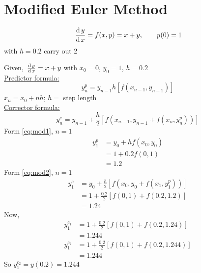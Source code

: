 \documentclass[../main-sheet.tex]{subfiles}
\begin{document}
\section{Modified Euler Method}
\begin{ex}
    \[\,\frac{\mathrm{d}\,y}{\mathrm{d}\,x}=f(x,y)=x+y,\qquad y(0)=1\]
    with \(h=0.2\) carry out 2 
\end{ex}
\begin{soln}
    Given, \(\,\frac{\mathrm{d}\,y}{\mathrm{d}\,x}=x+y\) with \(x_0=0\), \(y_0=1\), \(h=0.2\)\\
    \underline{Predictor formula:}\\
    \begin{equation}
        y_n^p=y_{n-1}h[f(x_{n-1},y_{n-1})] \label{eq:mod1}
    \end{equation}
    \(x_n=x_0+nh\); \(h=\) step length\\
    \underline{Corrector formula:}\\
    \begin{equation}
        y_n^c=y_{n-1}+\frac{h}{2}[f(x_{n-1},y_{n-1}+f(x_{n},y_{n}^{p}))]\label{eq:mod2}
    \end{equation}
    Form \eqref{eq:mod1}, \(n=1\)
    \begin{align*}
        y_1^p&=y_0+hf(x_0,y_0)\\
        &=1+0.2 f(0,1)\\
        &=1.2
    \end{align*}
    Form \eqref{eq:mod2}, \(n=1\)
    \begin{align*}
        y_1^c&=y_0+\frac{h}{2}[f(x_{0},y_{0}+f(x_{1},y_{1}^{p}))]\\
        &=1+\frac{0.2}{2}[ f(0,1)+f(0.2,1.2)]\\
        &=1.24
    \end{align*}
    Now,
    \begin{align*}
        y_1^{c_1}&=1+\frac{0.2}{2}\left[ f(0,1)+f(0.2,1.24) \right]\\
        &=1.244\\
        y_1^{c_2}&=1+\frac{0.2}{2}\left[ f(0,1)+f(0.2,1.244) \right]\\
        &=1.244
    \end{align*}
    So \(y_1^{c_2}=y(0.2)=1.244\)
\end{soln}
\end{document}
